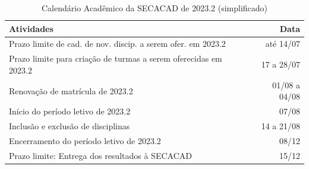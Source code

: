 \begin{table}[H] \centering \caption{Calendário Acadêmico da SECACAD de 2023.2 (simplificado)} \label{tab:calendario_SECACAD-2023.2}
  \begin{tabular}{| l r |}
    \hline
    \textbf{Atividades}                                              & \textbf{Data} \\
    \hline
    Prazo limite de cad. de nov. discip. a serem ofer. em 2023.2     & até 14/07     \\
    Prazo limite para criação de turmas a serem oferecidas em 2023.2 & 17 a 28/07    \\
    Renovação de matrícula de 2023.2                                 & 01/08 a 04/08 \\
    Início do período letivo de 2023.2                               & 07/08         \\
    Inclusão e exclusão de disciplinas                               & 14 a 21/08    \\
    Encerramento do período letivo de 2023.2                         & 08/12         \\
    Prazo limite: Entrega dos resultados à SECACAD                   & 15/12         \\
    \hline
  \end{tabular}
\end{table}

